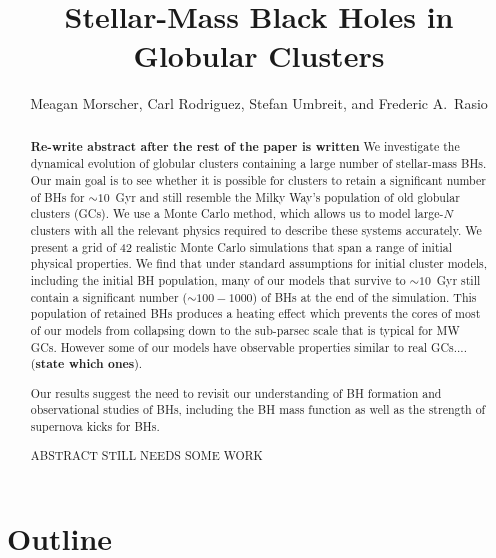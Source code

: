 \documentclass[12pt,preprint]{aastex}
\begin{document}
\title{Stellar-Mass Black Holes in Globular Clusters}
  
\author{Meagan Morscher, Carl Rodriguez, Stefan Umbreit, and Frederic A.\ Rasio}





\begin{abstract}
\textbf{Re-write abstract after the rest of the paper is written}
We investigate the dynamical evolution of globular clusters containing a large number of stellar-mass BHs. Our main goal is to see whether it is possible for clusters to retain a significant number of BHs for $\sim 10\,$ Gyr and still resemble the Milky Way's population of old globular clusters (GCs). We use a Monte Carlo method, which allows us to model large-$N$ clusters with all the relevant physics required to describe these systems accurately. We present a grid of 42 realistic Monte Carlo simulations that span a range of initial physical properties. We find that under standard assumptions for initial cluster models, including the initial BH population, many of our models that survive to $\sim 10\,$ Gyr still contain a significant number ($\sim 100-1000$) of BHs at the end of the simulation. This population of retained BHs produces a heating effect which prevents the cores of most of our models from collapsing down to the sub-parsec scale that is typical for MW GCs. However some of our models have observable properties similar to real GCs....(\textbf{state which ones}). 

Our results suggest the need to revisit our understanding of BH formation and observational studies of BHs, including the BH mass function as well as the strength of supernova kicks for BHs.
	
	 ABSTRACT STILL NEEDS SOME WORK

\end{abstract}


\clearpage
\section{Outline}
\end{document}
